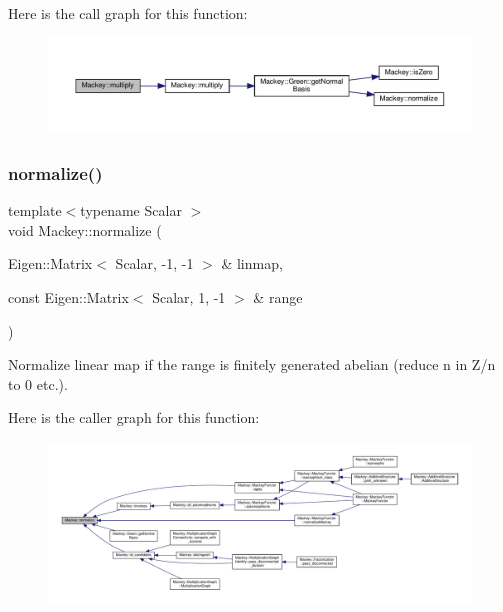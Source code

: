 Here is the call graph for this function\+:\nopagebreak
\begin{figure}[H]
\begin{center}
\leavevmode
\includegraphics[width=350pt]{namespaceMackey_a2eca4cc709501ad3fc20b82fe4bcbd33_cgraph}
\end{center}
\end{figure}
\mbox{\label{namespaceMackey_a40d5c8d3e43cd2ee3df09664bc8c56ea}} 
\subsubsection{\texorpdfstring{normalize()}{normalize()}\hspace{0.1cm}{\footnotesize\ttfamily [1/2]}}
{\footnotesize\ttfamily template$<$typename Scalar $>$ \\
void Mackey\+::normalize (\begin{DoxyParamCaption}\item[{Eigen\+::\+Matrix$<$ Scalar, -\/1, -\/1 $>$ \&}]{linmap,  }\item[{const Eigen\+::\+Matrix$<$ Scalar, 1, -\/1 $>$ \&}]{range }\end{DoxyParamCaption})}



Normalize linear map if the range is finitely generated abelian (reduce n in Z/n to 0 etc.). 

Here is the caller graph for this function\+:\nopagebreak
\begin{figure}[H]
\begin{center}
\leavevmode
\includegraphics[width=350pt]{namespaceMackey_a40d5c8d3e43cd2ee3df09664bc8c56ea_icgraph}
\end{center}
\end{figure}
\mbox{\label{namespaceMackey_a635c87980358b97256fe159f0c59bb80}} 
